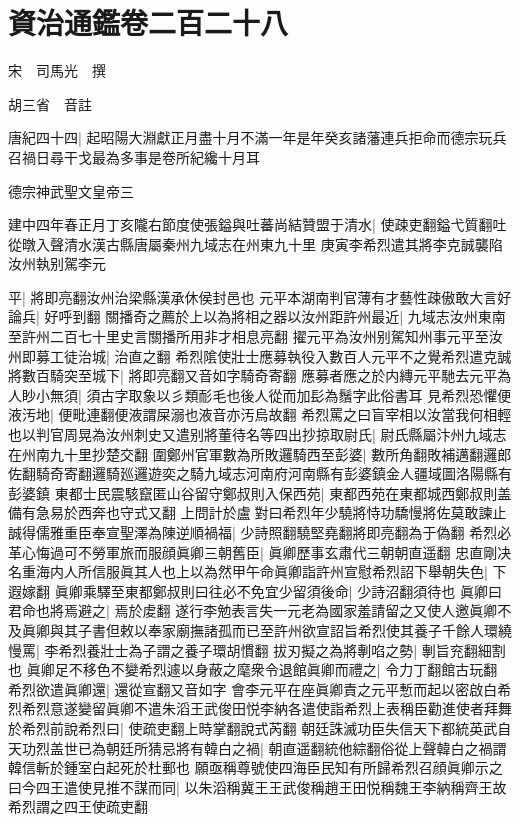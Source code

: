 \section{資治通鑑卷二百二十八}
宋　司馬光　撰

胡三省　音註

唐紀四十四|{
	起昭陽大淵獻正月盡十月不滿一年是年癸亥諸藩連兵拒命而德宗玩兵召禍日尋干戈最為多事是卷所紀纔十月耳}


德宗神武聖文皇帝三

建中四年春正月丁亥隴右節度使張鎰與吐蕃尚結贊盟于清水|{
	使疎吏翻鎰弋質翻吐從暾入聲清水漢古縣唐屬秦州九域志在州東九十里}
庚寅李希烈遣其將李克誠襲陷汝州執别駕李元

平|{
	將即亮翻汝州治梁縣漢承休侯封邑也}
元平本湖南判官薄有才藝性疎傲敢大言好論兵|{
	好呼到翻}
關播奇之薦於上以為將相之器以汝州距許州最近|{
	九域志汝州東南至許州二百七十里史言關播所用非才相息亮翻}
擢元平為汝州别駕知州事元平至汝州即募工徒治城|{
	治直之翻}
希烈隂使壯士應募執役入數百人元平不之覺希烈遣克誠將數百騎突至城下|{
	將即亮翻又音如字騎奇寄翻}
應募者應之於内縳元平馳去元平為人眇小無須|{
	須古字取象以彡類耏毛也後人從而加髟為鬚字此俗書耳}
見希烈恐懼便液汚地|{
	便毗連翻便液謂屎溺也液音亦汚烏故翻}
希烈罵之曰盲宰相以汝當我何相輕也以判官周晃為汝州刺史又遣别將董待名等四出抄掠取尉氏|{
	尉氏縣屬汴州九域志在州南九十里抄楚交翻}
圍鄭州官軍數為所敗邏騎西至彭婆|{
	數所角翻敗補邁翻邏郎佐翻騎奇寄翻邏騎廵邏遊奕之騎九域志河南府河南縣有彭婆鎮金人疆域圖洛陽縣有彭婆鎮}
東都士民震駭竄匿山谷留守鄭叔則入保西苑|{
	東都西苑在東都城西鄭叔則盖備有急易於西奔也守式又翻}
上問計於盧對曰希烈年少驍將恃功驕慢將佐莫敢諫止誠得儒雅重臣奉宣聖澤為陳逆順禍福|{
	少詩照翻驍堅堯翻將即亮翻為于偽翻}
希烈必革心悔過可不勞軍旅而服顔眞卿三朝舊臣|{
	眞卿歷事玄肅代三朝朝直遥翻}
忠直剛决名重海内人所信服眞其人也上以為然甲午命眞卿詣許州宣慰希烈詔下舉朝失色|{
	下遐嫁翻}
眞卿乘驛至東都鄭叔則曰往必不免宜少留須後命|{
	少詩沼翻須待也}
眞卿曰君命也將焉避之|{
	焉於䖍翻}
遂行李勉表言失一元老為國家羞請留之又使人邀眞卿不及眞卿與其子書但敕以奉家廟撫諸孤而已至許州欲宣詔旨希烈使其養子千餘人環繞慢罵|{
	李希烈養壯士為子謂之養子環胡慣翻}
拔刃擬之為將剸啗之勢|{
	剸旨兖翻細割也}
眞卿足不移色不變希烈遽以身蔽之麾衆令退館眞卿而禮之|{
	令力丁翻館古玩翻}
希烈欲遣眞卿還|{
	還從宣翻又音如字}
會李元平在座眞卿責之元平慙而起以密啟白希烈希烈意遂變留眞卿不遣朱滔王武俊田悦李納各遣使詣希烈上表稱臣勸進使者拜舞於希烈前說希烈曰|{
	使疏吏翻上時掌翻說式芮翻}
朝廷誅滅功臣失信天下都統英武自天功烈盖世已為朝廷所猜忌將有韓白之禍|{
	朝直遥翻統他綜翻俗從上聲韓白之禍謂韓信斬於鍾室白起死於杜郵也}
願亟稱尊號使四海臣民知有所歸希烈召顔眞卿示之曰今四王遣使見推不謀而同|{
	以朱滔稱冀王王武俊稱趙王田悦稱魏王李納稱齊王故希烈謂之四王使疏吏翻}
